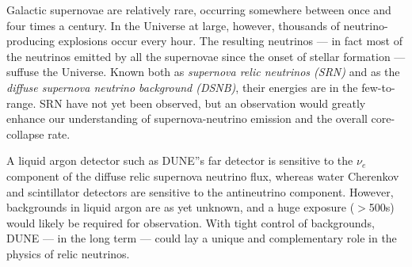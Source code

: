 Galactic supernovae are relatively rare, occurring somewhere between
once and four times a century. In the Universe
at large, however, thousands of neutrino-producing explosions occur
every hour.  The resulting neutrinos --- in fact most of the neutrinos
emitted by all the supernovae since the onset of stellar formation ---
suffuse the Universe.  Known both as \emph{supernova relic neutrinos
  (SRN)} and as the \emph{diffuse supernova neutrino background
  (DSNB)}, their energies are in the few-to- range.  SRN
have not yet been observed, but an observation would greatly enhance
our understanding of supernova-neutrino emission and the overall
core-collapse rate.


A liquid argon detector such as DUNE''s far detector is sensitive to
the $\nu_e$ component of the diffuse relic supernova neutrino flux,
whereas water Cherenkov and scintillator detectors are sensitive to
the antineutrino component.  However, backgrounds in liquid argon are as
yet unknown, and a huge exposure ($>$\SI{500}{\ktyr}s)
would likely be required for observation.  
With tight control of
backgrounds, %
DUNE --- in the long term --- could %
lay a unique and
 complementary role in the physics of relic neutrinos.

%


